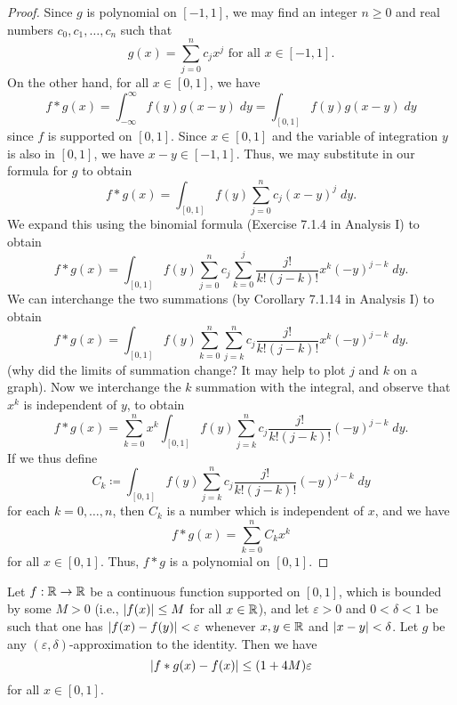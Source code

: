 \begin{proof}
  Since \(g\) is polynomial on \([-1, 1]\), we may find an integer \(n \geq 0\) and real numbers \(c_0, c_1, \dots, c_n\) such that
  \[
    g(x) = \sum_{j = 0}^n c_j x^j \text{ for all } x \in [-1, 1].
  \]
  On the other hand, for all \(x \in [0, 1]\), we have
  \[
    f * g(x) = \int_{-\infty}^\infty f(y) g(x - y) \; dy = \int_{[0, 1]} f(y) g(x - y) \; dy
  \]
  since \(f\) is supported on \([0, 1]\).
  Since \(x \in [0, 1]\) and the variable of integration \(y\) is also in \([0, 1]\), we have \(x - y \in [-1, 1]\).
  Thus, we may substitute in our formula for \(g\) to obtain
  \[
    f * g(x) = \int_{[0, 1]} f(y) \sum_{j = 0}^n c_j (x - y)^j \; dy.
  \]
  We expand this using the binomial formula (Exercise 7.1.4 in Analysis I) to obtain
  \[
    f * g(x) = \int_{[0, 1]} f(y) \sum_{j = 0}^n c_j \sum_{k = 0}^j \dfrac{j!}{k! (j - k)!} x^k (-y)^{j - k} \; dy.
  \]
  We can interchange the two summations (by Corollary 7.1.14 in Analysis I) to obtain
  \[
    f * g(x) = \int_{[0, 1]} f(y) \sum_{k = 0}^n \sum_{j = k}^n c_j \dfrac{j!}{k! (j - k)!} x^k (-y)^{j - k} \; dy.
  \]
  (why did the limits of summation change? It may help to plot \(j\) and \(k\) on a graph).
  Now we interchange the \(k\) summation with the integral, and observe that \(x^k\) is independent of \(y\), to obtain
  \[
    f * g(x) = \sum_{k = 0}^n x^k \int_{[0, 1]} f(y) \sum_{j = k}^n c_j \dfrac{j!}{k! (j - k)!} (-y)^{j - k} \; dy.
  \]
  If we thus define
  \[
    C_k \coloneqq \int_{[0, 1]} f(y) \sum_{j = k}^n c_j \dfrac{j!}{k! (j - k)!} (-y)^{j - k} \; dy
  \]
  for each \(k = 0, \dots, n\), then \(C_k\) is a number which is independent of \(x\), and we have
  \[
    f * g(x) = \sum_{k = 0}^n C_k x^k
  \]
  for all \(x \in [0, 1]\).
  Thus, \(f * g\) is a polynomial on \([0, 1]\).
\end{proof}

\begin{lem}\label{ii:3.8.14}
  Let \(f : \mathbb{R} \to \mathbb{R}\) be a continuous function supported on \([0, 1]\), which is bounded by some \(M > 0\) (i.e., \(\left\lvert f(x)\right\rvert \leq M\) for all \(x \in \mathbb{R}\)), and let \(\varepsilon > 0\) and \(0 < \delta < 1\) be such that one has \(\left\lvert f(x) - f(y)\right\rvert < \varepsilon\) whenever \(x, y \in \mathbb{R}\) and \(\left\lvert x - y\right\rvert < \delta\).
  Let \(g\) be any \((\varepsilon, \delta)\)-approximation to the identity.
  Then we have
  \[
    \left\lvert f * g(x) - f(x)\right\rvert \leq (1 + 4M) \varepsilon
  \]
  for all \(x \in [0, 1]\).
\end{lem}


